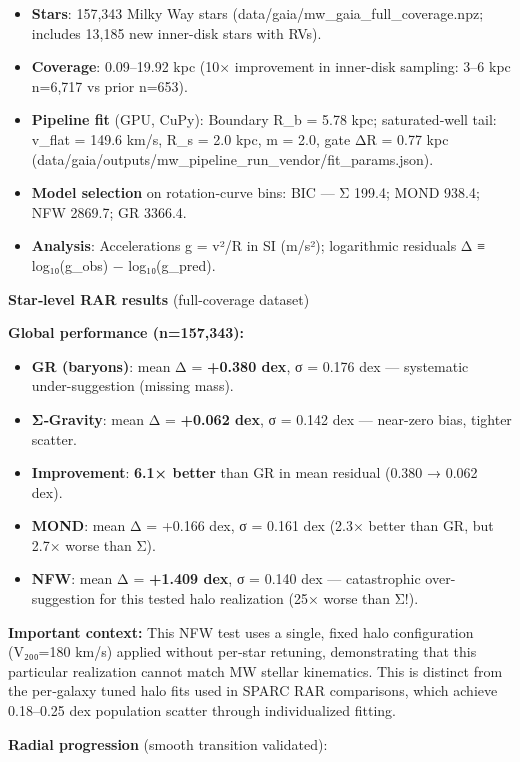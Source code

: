 \documentclass[11pt,a4paper]{article}
\begin{document}
\begin{itemize}
\item \textbf{Stars}: 157,343 Milky Way stars (data/gaia/mw\_gaia\_full\_coverage.npz; includes 13,185 new inner-disk stars with RVs).
\item \textbf{Coverage}: 0.09–19.92 kpc (10× improvement in inner-disk sampling: 3–6 kpc n=6,717 vs prior n=653).
\item \textbf{Pipeline fit} (GPU, CuPy): Boundary R\_b = 5.78 kpc; saturated‑well tail: v\_flat = 149.6 km/s, R\_s = 2.0 kpc, m = 2.0, gate ΔR = 0.77 kpc (data/gaia/outputs/mw\_pipeline\_run\_vendor/fit\_params.json).
\item \textbf{Model selection} on rotation‑curve bins: BIC — Σ 199.4; MOND 938.4; NFW 2869.7; GR 3366.4.
\item \textbf{Analysis}: Accelerations g = v²/R in SI (m/s²); logarithmic residuals Δ ≡ log₁₀(g\_obs) − log₁₀(g\_pred).
\end{itemize}


\textbf{Star‑level RAR results} (full-coverage dataset)


\textbf{Global performance (n=157,343):}

\begin{itemize}
\item \textbf{GR (baryons)}: mean Δ = \textbf{+0.380 dex}, σ = 0.176 dex — systematic under-suggestion (missing mass).
\item \textbf{Σ‑Gravity}: mean Δ = \textbf{+0.062 dex}, σ = 0.142 dex — near-zero bias, tighter scatter.
\item \textbf{Improvement}: \textbf{6.1× better} than GR in mean residual (0.380 → 0.062 dex).
\item \textbf{MOND}: mean Δ = +0.166 dex, σ = 0.161 dex (2.3× better than GR, but 2.7× worse than Σ).
\item \textbf{NFW}: mean Δ = \textbf{+1.409 dex}, σ = 0.140 dex — catastrophic over-suggestion for this tested halo realization (25× worse than Σ!).
\end{itemize}


\textbf{Important context:} This NFW test uses a single, fixed halo configuration (V₂₀₀=180 km/s) applied without per‑star retuning, demonstrating that this particular realization cannot match MW stellar kinematics. This is distinct from the per‑galaxy tuned halo fits used in SPARC RAR comparisons, which achieve 0.18–0.25 dex population scatter through individualized fitting.


\textbf{Radial progression} (smooth transition validated):
\end{document}
